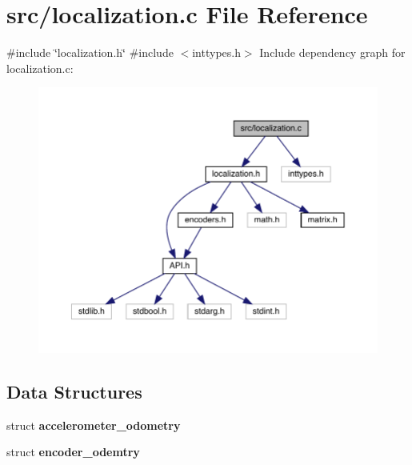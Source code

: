 \section{src/localization.c File Reference}
\label{localization_8c}
{\ttfamily \#include \char`\"{}localization.\+h\char`\"{}}\newline
{\ttfamily \#include $<$inttypes.\+h$>$}\newline
Include dependency graph for localization.\+c\+:\nopagebreak
\begin{figure}[H]
\begin{center}
\leavevmode
\includegraphics[width=350pt]{localization_8c__incl}
\end{center}
\end{figure}
\subsection*{Data Structures}
\begin{DoxyCompactItemize}
\item 
struct \textbf{ accelerometer\+\_\+odometry}
\item 
struct \textbf{ encoder\+\_\+odemtry}
\end{DoxyCompactItemize}

